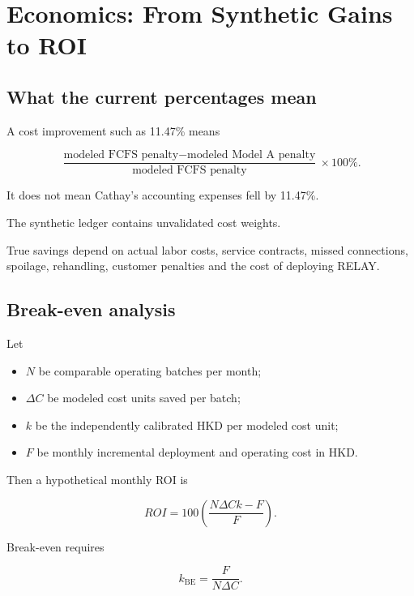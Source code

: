 \documentclass[10pt,a4paper]{article}
\theoremstyle{plain}
\theoremstyle{definition}
\theoremstyle{remark}
\begin{document}
\section{Economics: From Synthetic Gains to ROI}

\subsection{What the current percentages mean}

A cost improvement such as 11.47\%
means

\[
\frac{
\text{modeled FCFS penalty}
-
\text{modeled Model A penalty}
}{
\text{modeled FCFS penalty}
}
\times100\%.
\]

It does not mean
Cathay's accounting expenses
fell by 11.47\%.

The synthetic ledger contains
unvalidated cost weights.

True savings depend on actual
labor costs, service contracts,
missed connections,
spoilage, rehandling,
customer penalties
and the cost of deploying RELAY.

\subsection{Break-even analysis}

Let

\begin{itemize}[leftmargin=18pt,itemsep=2pt]
\item \(N\) be comparable operating batches per month;
\item \(\Delta C\) be modeled cost units
saved per batch;
\item \(k\) be the independently calibrated
HKD per modeled cost unit;
\item \(F\) be monthly incremental deployment
and operating cost in HKD.
\end{itemize}

Then a hypothetical monthly ROI is

\begin{equation}
ROI=
100
\left(
\frac{N\Delta Ck-F}{F}
\right).
\label{eq:roi}
\end{equation}

Break-even requires

\begin{equation}
k_{\mathrm{BE}}
=
\frac{F}{N\Delta C}.
\label{eq:breakeven}
\end{equation}
\end{document}

